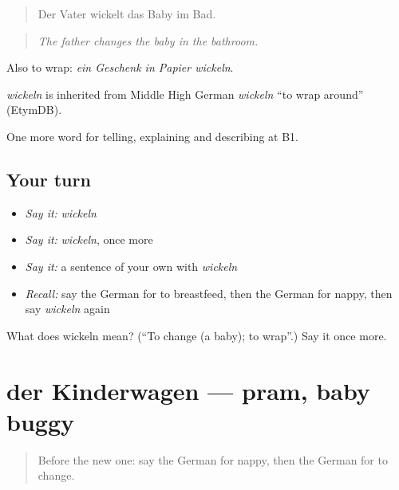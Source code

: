 \begin{quote}
Der Vater wickelt das Baby im Bad.
\end{quote}

\begin{quote}
\emph{The father changes the baby in the bathroom.}
\end{quote}

Also to wrap: \emph{ein Geschenk in Papier wickeln}.

\begin{cousinweb}
\emph{wickeln} is inherited from Middle High German \emph{wickeln} \textquotedblleft{}to wrap around\textquotedblright{} (EtymDB).
\end{cousinweb}

\begin{grammarlens}[title={What you've built}]
One more word for telling, explaining and describing at B1.
\end{grammarlens}

\subsection*{Your turn}
\begin{itemize}
\raggedright
  \item \emph{Say it:} \emph{wickeln}
  \item \emph{Say it:} \emph{wickeln}, once more
  \item \emph{Say it:} a sentence of your own with \emph{wickeln}
  \item \emph{Recall:} say the German for to breastfeed, then the German for nappy, then say \emph{wickeln} again
\end{itemize}

\begin{tcolorbox}[breakable,colback=teal!4,colframe=teal!35!black,title={Before you move on}]
What does wickeln mean? (\textquotedblleft{}To change (a baby); to wrap\textquotedblright{}.) Say it once more.
\end{tcolorbox}
\section[der Kinderwagen]{der Kinderwagen — pram, baby buggy}

\label{lesson:GE-C496-kinderwagen}



\begin{quote}
Before the new one: say the German for nappy, then the German for to change.
\end{quote}

